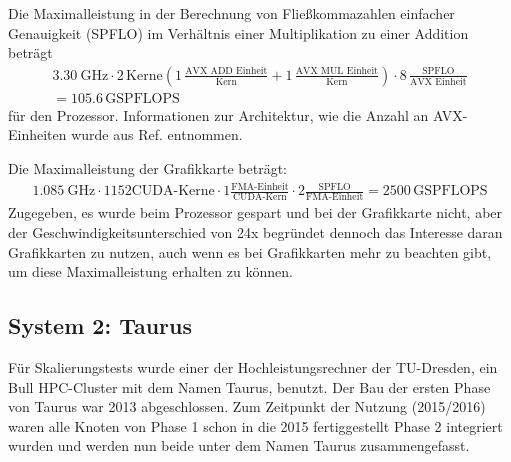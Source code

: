 \documentclass[german,bibnum,beleg,zihtitle,german,hyperref,utf8]{zihpub}
\begin{document}
Die Maximalleistung in der Berechnung von Fließkommazahlen einfacher Genauigkeit (SPFLO) im Verhältnis einer Multiplikation zu einer Addition beträgt
\begin{align}
	\SI{3.30}{\giga\hertz} \cdot
	2\,\text{Kerne} \left( 
		1\,\frac{ \text{AVX ADD Einheit} }{ \text{Kern} } + 
		1\,\frac{ \text{AVX MUL Einheit} }{ \text{Kern} } 
	\right) \cdot
	8\,\frac{ \text{SPFLO} }{ \text{AVX Einheit} } \\ 
	= 105.6\,\text{GSPFLOPS}
\end{align}
für den Prozessor. Informationen zur Architektur, wie die Anzahl an AVX-Einheiten wurde aus Ref.\cite{cesga} entnommen.

Die Maximalleistung der Grafikkarte beträgt:
\begin{align}
	\SI{1.085}{\giga\hertz} \cdot 1152 \text{CUDA-Kerne} \cdot
	1 \frac{ \text{FMA-Einheit} }{ \text{CUDA-Kern} } \cdot
	2 \frac{ \text{SPFLO} }{ \text{FMA-Einheit} }
	= 2500\,\text{GSPFLOPS}
\end{align}
Zugegeben, es wurde beim Prozessor gespart und bei der Grafikkarte nicht, aber der Geschwindigkeitsunterschied von 24x begründet dennoch das Interesse daran Grafikkarten zu nutzen, auch wenn es bei Grafikkarten mehr zu beachten gibt, um diese Maximalleistung erhalten zu können.


\subsection{System 2: Taurus}
\label{sct:system2}

Für Skalierungstests wurde einer der Hochleistungsrechner der TU-Dresden, ein Bull HPC-Cluster mit dem Namen Taurus, benutzt. Der Bau der ersten Phase von Taurus war 2013 abgeschlossen\cite{taurusnutzerschulung}. Zum Zeitpunkt der Nutzung (2015/2016) waren alle Knoten von Phase 1 schon in die 2015 fertiggestellt\cite{heisehrsk2} Phase 2 integriert wurden\cite{doctudtaurushardware} und werden nun beide unter dem Namen Taurus zusammengefasst.
\end{document}
